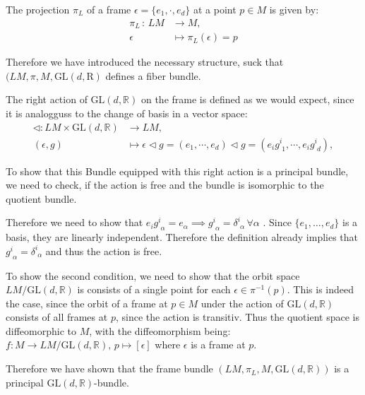 The projection $\pi_L$ of a frame $\epsilon = \{e_1, \cdot, e_d\}$ at a point \(p\in M\) is given by:
\begin{align*}
  \pi_L \, : \, LM &\longrightarrow M, \\
        \epsilon &\mapsto \pi_L(\epsilon)=p
\end{align*}

Therefore we have introduced the necessary structure, suck that $(LM, \pi, M, \text{GL}(d,\mathrm{R})$ defines a fiber bundle. 

The right action of \( \mathrm{GL}(d,\mathbb{R}) \) on the frame is defined as we would expect, since it is analogguss to the change of basis in a vector space:
\begin{align*}
  \triangleleft : LM \times \mathrm{GL}(d,\mathbb{R}) &\longrightarrow LM, \\
  (\epsilon, g) &\mapsto \epsilon \triangleleft g = (e_1, \cdots, e_d) \triangleleft g = (e_i g^i_{\,\,1}, \cdots, e_i g^i_{\,\,d}),
\end{align*}

To show that this Bundle equipped with this right action is a principal bundle, we need to check, if the action is free and the bundle is isomorphic to the quotient bundle.

Therefore we need to show that \( e_i g^i_{\,\,\alpha} = e_\alpha \implies g^i_{\,\,\alpha} = \delta^i_{\,\,\alpha} \, \forall \alpha \) . Since \( \{e_1, \dots, e_d\} \) is a basis, they are linearly independent. Therefore the definition already implies that \( g^i_{\,\,\alpha} = \delta^i_{\,\,\alpha} \) and thus the action is free.

To show the second condition, we need to show that the orbit space \( LM/\mathrm{GL}(d,\mathbb{R}) \) is consists of a single point for each \( \epsilon \in \pi^{-1}(p) \). This is indeed the case, since the orbit of a frame at \( p \in M \) under the action of \( \mathrm{GL}(d,\mathbb{R}) \) consists of all frames at \( p \), since the action is transitiv. Thus the quotient space is diffeomorphic to \( M \), with the diffeomorphism being: \( f: M \longrightarrow LM/\mathrm{GL}(d, \mathbb{R}), \, p \mapsto [\epsilon] \) where \( \epsilon \) is a frame at \( p \).

Therefore we have shown that the frame bundle \( (LM, \pi_L, M, \mathrm{GL}(d,\mathbb{R})) \) is a principal \( \mathrm{GL}(d,\mathbb{R}) \)-bundle.




